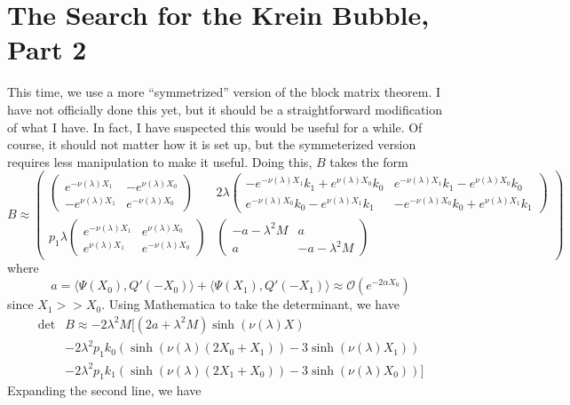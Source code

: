 \documentclass[thesis.tex]{subfiles}
\begin{document}
\section{The Search for the Krein Bubble, Part 2}

This time, we use a more ``symmetrized'' version of the block matrix theorem. I have not officially done this yet, but it should be a straightforward modification of what I have. In fact, I have suspected this would be useful for a while. Of course, it should not matter how it is set up, but the symmeterized version requires less manipulation to make it useful. Doing this, $B$ takes the form
\[
B \approx \begin{pmatrix}
\begin{pmatrix}
e^{-\nu(\lambda)X_1} & -e^{\nu(\lambda)X_0} \\
-e^{\nu(\lambda)X_1} & e^{-\nu(\lambda)X_0} 
\end{pmatrix} &
2 \lambda \begin{pmatrix}
-e^{-\nu(\lambda)X_1} k_1 + e^{\nu(\lambda)X_0} k_0 & e^{-\nu(\lambda)X_1} k_1 - e^{\nu(\lambda)X_0} k_0 \\ e^{-\nu(\lambda)X_0} k_0 - e^{\nu(\lambda)X_1} k_1 & -e^{-\nu(\lambda)X_0} k_0 + e^{\nu(\lambda)X_1} k_1
\end{pmatrix} \\
p_1 \lambda
\begin{pmatrix}
e^{-\nu(\lambda)X_1} & e^{\nu(\lambda)X_0} \\
e^{\nu(\lambda)X_1} & e^{-\nu(\lambda)X_0} 
\end{pmatrix} &
\begin{pmatrix}
-a - \lambda^2 M & a \\
a & -a - \lambda^2 M
\end{pmatrix}
\end{pmatrix}
\]
where
\[
a = \langle \Psi(X_0), Q'(-X_0) \rangle
+ \langle \Psi(X_1), Q'(-X_1) \rangle \approx \mathcal{O}(e^{-2\alpha X_0})
\]
since $X_1 >> X_0$. Using Mathematica to take the determinant, we have
\begin{align*}
\det &B \approx -2 \lambda^2 M \Big[ (2a + \lambda^2 M) \sinh(\nu(\lambda)X) \\
&- 2 \lambda^2 p_1 k_0 \left( \sinh(\nu(\lambda)(2 X_0 + X_1)) - 3 \sinh(\nu(\lambda)X_1)  \right) \\
&- 2 \lambda^2 p_1 k_1 \left( \sinh(\nu(\lambda)(2 X_1 + X_0)) - 3 \sinh(\nu(\lambda)X_0)  \right) \Big] 
\end{align*}
Expanding the second line, we have
\end{document}
